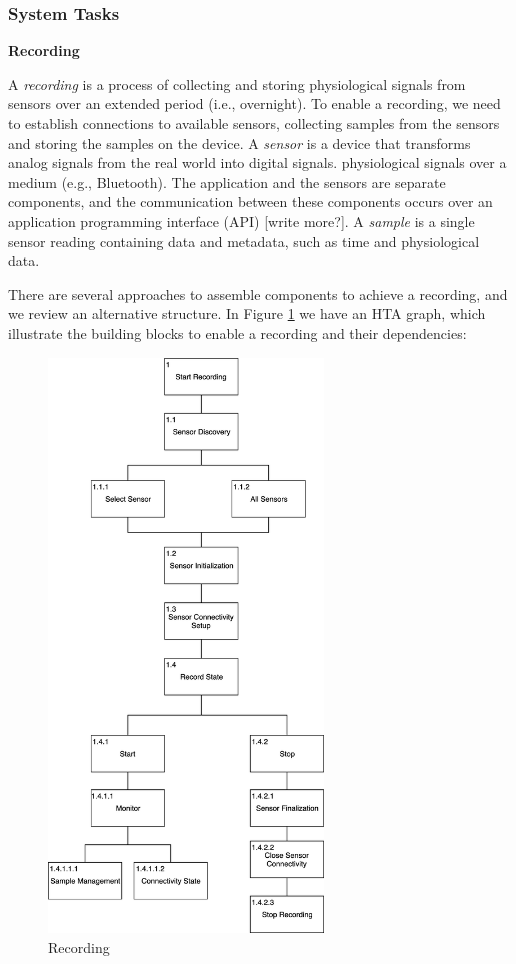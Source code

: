 \subsubsection{System Tasks}

\textbf{Recording}

\noindent A \textit{recording} is a process of collecting and storing physiological signals from sensors over an extended period (i.e., overnight). To enable a recording, we need to establish connections to available sensors, collecting samples from the sensors and storing the samples on the device. A \textit{sensor} is a device that transforms analog signals from the real world into digital signals.  physiological signals over a medium (e.g., Bluetooth). The application and the sensors are separate components, and the communication between these components occurs over an application programming interface (API) [write more?]. A \textit{sample} is a single sensor reading containing data and metadata, such as time and physiological data.  
    
There are several approaches to assemble components to achieve a recording, and we review an alternative structure. In Figure \ref{fig:hta_recording} we have an HTA graph, which illustrate the building blocks to enable a recording and their dependencies:

\begin{figure}
    \centering
    \includegraphics[width=0.65\textwidth]{images/Recording.png}
    \caption{Recording}
    \label{fig:hta_recording}
\end{figure}

